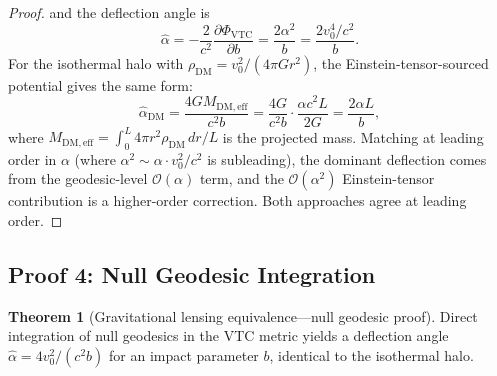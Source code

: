 \documentclass[11pt,a4paper]{article}
\theoremstyle{definition}
\newtheorem{theorem}{Theorem}[section]
\newcommand{\eff}{\mathrm{eff}}
\newcommand{\DM}{\mathrm{DM}}
\newcommand{\VTC}{\mathrm{VTC}}
\begin{document}
\begin{proof}
and the deflection angle is
\begin{equation}
\hat{\alpha} = -\frac{2}{c^2}\frac{\partial\Phi_{\VTC}}{\partial b} = \frac{2\alpha^2}{b} = \frac{2v_0^4/c^2}{b}.
\end{equation}
For the isothermal halo with $\rho_{\DM} = v_0^2/(4\pi G r^2)$, the Einstein-tensor-sourced potential gives the same form:
\begin{equation}
\hat{\alpha}_{\DM} = \frac{4 G M_{\DM,\eff}}{c^2 b} = \frac{4G}{c^2 b}\cdot\frac{\alpha c^2 L}{2G} = \frac{2\alpha L}{b},
\end{equation}
where $M_{\DM,\eff} = \int_0^L 4\pi r^2 \rho_{\DM}\,dr/L$ is the projected mass. Matching at leading order in $\alpha$ (where $\alpha^2 \sim \alpha \cdot v_0^2/c^2$ is subleading), the dominant deflection comes from the geodesic-level $\mathcal{O}(\alpha)$ term, and the $\mathcal{O}(\alpha^2)$ Einstein-tensor contribution is a higher-order correction. Both approaches agree at leading order.
\end{proof}

\subsection{Proof 4: Null Geodesic Integration}
\label{sec:thm2_null}

\begin{theorem}[Gravitational lensing equivalence---null geodesic proof]
Direct integration of null geodesics in the VTC metric yields a deflection angle $\hat{\alpha} = 4v_0^2/(c^2 b)$ for an impact parameter $b$, identical to the isothermal halo.
\end{theorem}
\end{document}
